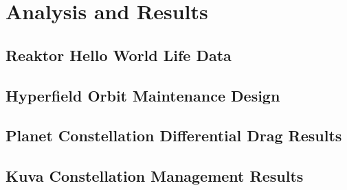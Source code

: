 \chapter{Analysis and Results}

\section{Reaktor Hello World Life Data}

\section{Hyperfield Orbit Maintenance Design}

\section{Planet Constellation Differential Drag Results}

\section{Kuva Constellation Management Results}